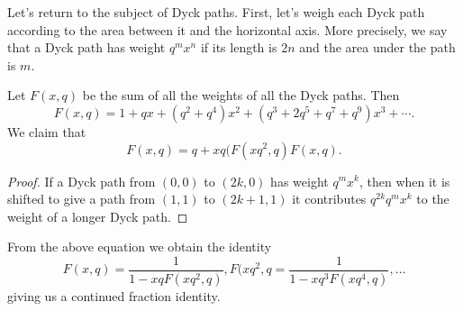 Let's return to the subject of Dyck paths. First, let's weigh each Dyck path according to the area between it and the horizontal axis. More precisely, we say that a Dyck path has weight $q^mx^n$ if its length is $2n$ and the area under the path is $m$.

Let $F(x, q)$ be the sum of all the weights of all the Dyck paths. Then
\[F(x, q) = 1 + qx + (q^2 + q^4)x^2 + (q^3 + 2q^5 + q^7 + q^9)x^3 + \cdots.\]
We claim that 
\[F(x, q) = q + xq(F(xq^2, q)F(x,q).\]
\begin{proof}
If a Dyck path from $(0, 0)$ to $(2k, 0)$ has weight $q^mx^k$, then when it is shifted to give a path from $(1, 1)$ to $(2k + 1, 1)$ it contributes $q^{2k}q^mx^k$ to the weight of a longer Dyck path.
\end{proof}

From the above equation we obtain the identity
\[F(x, q) = \frac{1}{1 - xqF(xq^2, q)}, F(xq^2, q = \frac{1}{1 - xq^3F(xq^4, q)}, \dots\]
giving us a continued fraction identity.